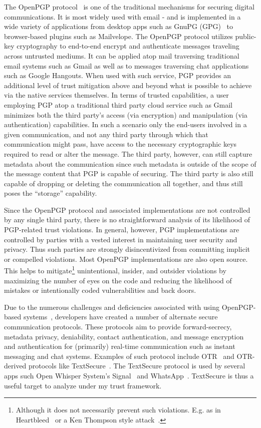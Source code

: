 The OpenPGP protocol~\cite{callas2007} is one of the traditional
mechanisms for securing digital communications. It is most widely used
with email - and is implemented in a wide variety of applications from
desktop apps such as GnuPG (GPG)~\cite{gnupg} to browser-based plugins
such as Mailvelope\cite{mailvelope}. The OpenPGP protocol utilizes
public-key cryptography to end-to-end encrypt and authenticate
messages traveling across untrusted mediums. It can be applied atop
mail traversing traditional email systems such as Gmail as well as to
messages traversing chat applications such as Google Hangouts. When
used with such service, PGP provides an additional level of trust
mitigation above and beyond what is possible to achieve via the native
services themselves. In terms of trusted capabilities, a user
employing PGP atop a traditional third party cloud service such as
Gmail minimizes both the third party's access (via encryption) and
manipulation (via authentication) capabilities. In such a scenario
only the end-users involved in a given communication, and not any
third party through which that communication might pass, have access
to the necessary cryptographic keys required to read or alter the
message. The third party, however, can still capture metadata about
the communication since such metadata is outside of the scope of the
message content that PGP is capable of securing. The third party is
also still capable of dropping or deleting the communication all
together, and thus still poses the ``storage'' capability.

Since the OpenPGP protocol and associated implementations are not
controlled by any single third party, there is no straightforward
analysis of its likelihood of PGP-related trust violations. In
general, however, PGP implementations are controlled by parties with a
vested interest in maintaining user security and privacy. Thus such
parties are strongly disincentivized from committing implicit or
compelled violations. Most OpenPGP implementations are also open
source. This helps to mitigate\footnote{Although it does not
  necessarily prevent such violations.  E.g. as in
  Heartbleed~\cite{heartbleed} or a Ken Thompson style
  attack~\cite{thompson1984}.} unintentional, insider, and outsider
violations by maximizing the number of eyes on the code and reducing
the likelihood of mistakes or intentionally coded vulnerabilities and
back doors.

Due to the numerous challenges and deficiencies associated with using
OpenPGP-based systems~\cite{green-pgp}, developers have created a
number of alternate secure communication protocols. These protocols
aim to provide forward-secrecy, metadata privacy, deniability, contact
authentication, and message encryption and authentication for
(primarily) real-time communication such as instant messaging and chat
systems. Examples of such protocol include OTR~\cite{otr-v3} and
OTR-derived protocols like TextSecure~\cite{otr-advanced-ratchet}. The
TextSecure protocol is used by several apps such Open Whisper System's
Signal~\cite{openwhisper} and WhatsApp~\cite{whatsapp}. TextSecure is
thus a useful target to analyze under my trust framework.

